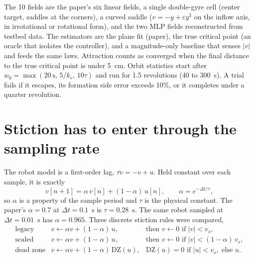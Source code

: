 \documentclass[10pt,letterpaper]{article}
\newcommand{\dt}{\Delta t}
\newcommand{\DZ}{\mathrm{DZ}}
\begin{document}
The 10 fields are the paper's six linear fields, a single double-gyre cell (center target, saddles at the corners), a curved saddle ($v = -y + \varepsilon y^3$ on the inflow axis, in irrotational or rotational form), and the two MLP fields reconstructed from testbed data. The estimators are the plane fit (paper), the true critical point (an oracle that isolates the controller), and a magnitude-only baseline that senses $|v|$ and feeds the same laws. Attraction counts as converged when the final distance to the true critical point is under 5~cm. Orbit statistics start after $w_0 = \max(20~\mathrm{s},\, 5/k_r,\, 10\tau)$ and run for 1.5 revolutions (40 to 300~s). A trial fails if it escapes, its formation side error exceeds 10\%, or it completes under a quarter revolution.

\section{Stiction has to enter through the sampling rate}\label{sec:stiction}

The robot model is a first-order lag, $\tau \dot v = -v + u$. Held constant over each sample, it is exactly
\begin{equation}\label{eq:lag}
v[n+1] = \alpha\, v[n] + (1-\alpha)\, u[n], \qquad \alpha = e^{-\dt/\tau},
\end{equation}
so $\alpha$ is a property of the sample period and $\tau$ is the physical constant. The paper's $\alpha = 0.7$ at $\dt = 0.1$~s is $\tau = 0.28$~s. The same robot sampled at $\dt = 0.01$~s has $\alpha = 0.965$. Three discrete stiction rules were compared,
\begin{equation}\label{eq:rules}
\begin{array}{lll}
\text{legacy} & v \leftarrow \alpha v + (1-\alpha)\,u, & \text{then } v \leftarrow 0 \text{ if } |v| < v_s, \\[2pt]
\text{scaled} & v \leftarrow \alpha v + (1-\alpha)\,u, & \text{then } v \leftarrow 0 \text{ if } |v| < (1-\alpha)\,v_s, \\[2pt]
\text{dead zone} & v \leftarrow \alpha v + (1-\alpha)\,\DZ(u), & \DZ(u) = 0 \text{ if } |u| < v_s, \text{ else } u.
\end{array}
\end{equation}
\end{document}
